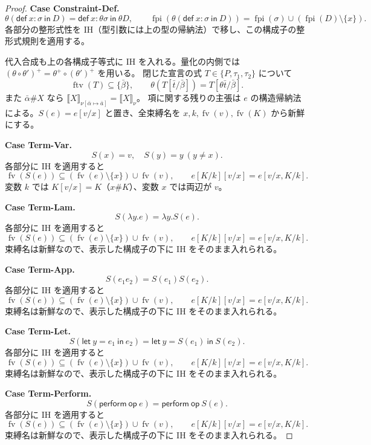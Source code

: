 \documentclass[a4paper,11pt]{article}
\theoremstyle{definition}
\newenvironment{Case}[1]{\par\smallskip\noindent\textbf{Case #1.}\enspace\ignorespaces}{\par}
\newcommand{\FV}{\operatorname{fv}}
\newcommand{\FTV}{\operatorname{ftv}}
\newcommand{\FPI}{\operatorname{fpi}}
\newcommand{\op}{\mathsf{op}}
\newcommand{\den}[1]{\llbracket #1\rrbracket}
\newcommand{\Def}[3]{\mathsf{def}\ #1:#2\ \mathsf{in}\ #3}
\newcommand{\lete}[3]{\mathsf{let}\ #1=#2\ \mathsf{in}\ #3}
\newcommand{\perform}[2]{\mathsf{perform}\ #1\ #2}
\begin{document}
\begin{proof}
\begin{Case}{Constraint-Def}
\[
 \theta(\Def x\sigma D)=\Def x{\theta\sigma}{\theta D},\qquad\FPI(\theta(\Def x\sigma D))=\FPI(\sigma)\cup(\FPI(D)\setminus\{x\}).
\]
各部分の整形式性を IH（型引数には上の型の帰納法）で移し、この構成子の整形式規則を適用する。
\end{Case}
代入合成も上の各構成子等式に IH を入れる。量化の内側では
$(\theta\circ\theta')^+=\theta^+\circ(\theta')^+$ を用いる。
閉じた宣言の式 $T\in\{P,\tau_1,\tau_2\}$ について
\[
 \FTV(T)\subseteq\{\bar\beta\},\qquad
 \theta(T[\bar t/\bar\beta])=T[\theta\bar t/\bar\beta].
\]
また $\bar\alpha\#X$ なら
$\den X_{\nu[\bar\alpha\mapsto\bar a]}=\den X_\nu$。
項に関する残りの主張は $e$ の構造帰納法による。$S(e)=e[v/x]$ と置き、全束縛名を
$x,k,\FV(v),\FV(K)$ から新鮮にする。

\begin{Case}{Term-Var}
\[S(x)=v,\quad S(y)=y\ (y\ne x).\]
各部分に IH を適用すると
\[
 \FV(S(e))\subseteq(\FV(e)\setminus\{x\})\cup\FV(v),\qquad
 e[K/k][v/x]=e[v/x,K/k].
\]
変数 $k$ では $K[v/x]=K$（$x\#K$）、変数 $x$ では両辺が $v$。
\end{Case}

\begin{Case}{Term-Lam}
\[S(\lambda y.e)=\lambda y.S(e).\]
各部分に IH を適用すると
\[
 \FV(S(e))\subseteq(\FV(e)\setminus\{x\})\cup\FV(v),\qquad
 e[K/k][v/x]=e[v/x,K/k].
\]
束縛名は新鮮なので、表示した構成子の下に IH をそのまま入れられる。
\end{Case}

\begin{Case}{Term-App}
\[S(e_1e_2)=S(e_1)S(e_2).\]
各部分に IH を適用すると
\[
 \FV(S(e))\subseteq(\FV(e)\setminus\{x\})\cup\FV(v),\qquad
 e[K/k][v/x]=e[v/x,K/k].
\]
束縛名は新鮮なので、表示した構成子の下に IH をそのまま入れられる。
\end{Case}

\begin{Case}{Term-Let}
\[S(\lete y{e_1}{e_2})=\lete y{S(e_1)}{S(e_2)}.\]
各部分に IH を適用すると
\[
 \FV(S(e))\subseteq(\FV(e)\setminus\{x\})\cup\FV(v),\qquad
 e[K/k][v/x]=e[v/x,K/k].
\]
束縛名は新鮮なので、表示した構成子の下に IH をそのまま入れられる。
\end{Case}

\begin{Case}{Term-Perform}
\[S(\perform\op e)=\perform\op{S(e)}.\]
各部分に IH を適用すると
\[
 \FV(S(e))\subseteq(\FV(e)\setminus\{x\})\cup\FV(v),\qquad
 e[K/k][v/x]=e[v/x,K/k].
\]
束縛名は新鮮なので、表示した構成子の下に IH をそのまま入れられる。
\end{Case}


\end{proof}
\end{document}
